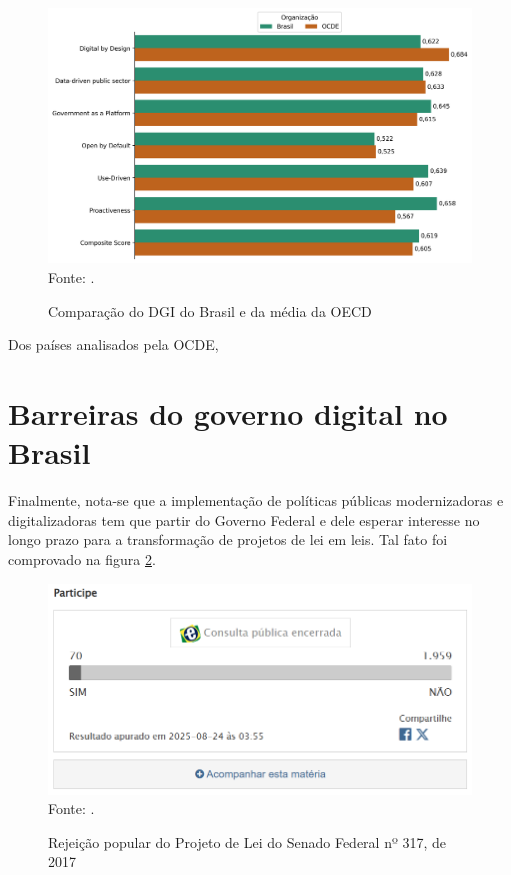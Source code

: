 \begin{figure}[H]
	\centering
	\caption{Comparação do DGI do Brasil e da média da OECD}
	\includegraphics[width=1\linewidth]{figuras/comparacao_dgi_brasil_mundo_2023}
	\label{fig:comparacao_dgi_brasil_mundo_2023}
	\footnotesize{Fonte: \cite{dgi_2023}.}
\end{figure}

Dos países analisados pela OCDE, 

\section{Barreiras do governo digital no Brasil}

Finalmente, nota-se que a implementação de políticas públicas modernizadoras e digitalizadoras tem que partir do Governo Federal e dele esperar interesse no longo prazo para a transformação de projetos de lei em leis. Tal fato foi comprovado na figura \ref{fig:participacao_votacao_popular_lgd}.

\begin{figure}[H]
	\centering
	\caption{Rejeição popular do Projeto de Lei do Senado Federal nº 317, de 2017}
	\includegraphics[width=1\linewidth]{figuras/participacao_votacao_popular_lgd}
	\label{fig:participacao_votacao_popular_lgd}
	\footnotesize{Fonte: \cite{pls_317_2021}.}
\end{figure}

